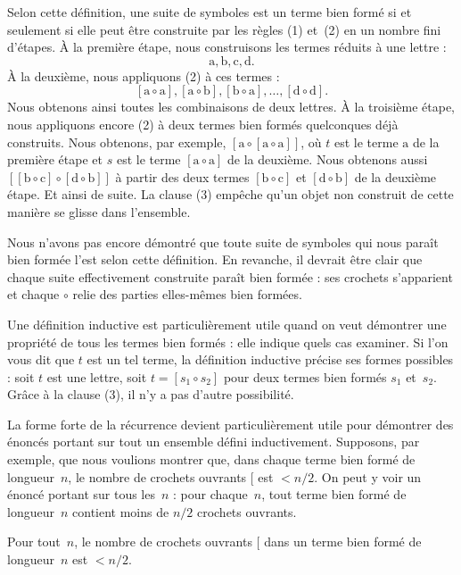 \documentclass[../../../include/open-logic-section]{subfiles}
\begin{document}
Selon cette définition,
une suite de symboles
est un terme bien
formé si et seulement
si elle peut être
construite par les
règles (1) et~(2)
en un nombre fini
d'étapes. À la
première étape,
nous construisons
les termes réduits
à une lettre :
\[
\mathrm{a}, \mathrm{b}, \mathrm{c}, \mathrm{d}.
\]
À la deuxième,
nous appliquons (2)
à ces termes :
\[
[\mathrm{a} \circ \mathrm{a}],
[\mathrm{a} \circ \mathrm{b}],
[\mathrm{b} \circ \mathrm{a}],
\dots, [\mathrm{d} \circ \mathrm{d}].
\]
Nous obtenons ainsi
toutes les combinaisons
de deux lettres.
À la troisième étape,
nous appliquons encore
(2) à deux termes
bien formés quelconques
déjà construits.
Nous obtenons, par
exemple,
$[\mathrm{a} \circ
  [\mathrm{a} \circ \mathrm{a}]]$,
où $t$ est le terme
$\mathrm{a}$ de la
première étape et
$s$ est le terme
$[\mathrm{a} \circ \mathrm{a}]$
de la deuxième.
Nous obtenons aussi
$[[\mathrm{b} \circ \mathrm{c}]
  \circ [\mathrm{d} \circ \mathrm{b}]]$
à partir des deux
termes
$[\mathrm{b} \circ \mathrm{c}]$
et
$[\mathrm{d} \circ \mathrm{b}]$
de la deuxième étape.
Et ainsi de suite.
La clause (3) empêche
qu'un objet non construit
de cette manière se
glisse dans l'ensemble.

Nous n'avons pas encore
démontré que toute suite
de symboles qui nous
paraît bien formée
l'est selon cette
définition. En revanche,
il devrait être clair
que chaque suite
effectivement construite
paraît bien formée :
ses crochets
s'apparient et
chaque $\circ$
relie des parties
elles-mêmes bien formées.

Une définition inductive
est particulièrement
utile quand on veut
démontrer une propriété
de tous les termes
bien formés : elle
indique quels cas
examiner. Si l'on
vous dit que $t$
est un tel terme,
la définition
inductive précise
ses formes possibles :
soit $t$ est une
lettre, soit
$t=[s_1 \circ s_2]$
pour deux termes
bien formés
$s_1$ et~$s_2$.
Grâce à la
clause (3),
il n'y a pas
d'autre possibilité.

La forme forte de
la récurrence devient
particulièrement utile
pour démontrer des
énoncés portant sur
tout un ensemble
défini inductivement.
Supposons, par exemple,
que nous voulions
montrer que, dans
chaque terme bien
formé de longueur~$n$,
le nombre de
crochets ouvrants
$[$ est $< n/2$.
On peut y voir
un énoncé portant
sur tous les~$n$ :
pour chaque~$n$,
tout terme bien
formé de longueur~$n$
contient moins de
$n/2$ crochets
ouvrants.

\begin{prop}
  Pour tout~$n$,
  le nombre de
  crochets ouvrants
  $[$ dans un
  terme bien formé
  de longueur~$n$
  est $< n/2$.
\end{prop}
\end{document}
